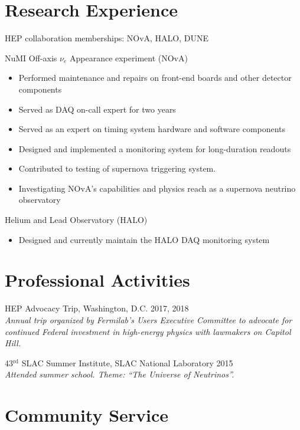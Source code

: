 \documentclass[11pt]{cv}
\begin{document}
\begin{cv}
\section{Research Experience}

HEP collaboration memberships: NOvA, HALO, DUNE

NuMI Off-axis $\nu_e$ Appearance experiment (NOvA)
\begin{itemize}
  \item Performed maintenance and repairs on front-end boards and other detector components
  \item Served as DAQ on-call expert for two years
  \item Served as an expert on timing system hardware and software components
  \item Designed and implemented a monitoring system for long-duration readouts
  \item Contributed to testing of supernova triggering system.
  \item Investigating NOvA's capabilities and physics reach as a supernova neutrino observatory
\end{itemize}

Helium and Lead Observatory (HALO)
\begin{itemize}
  \item Designed and currently maintain the HALO DAQ monitoring system
\end{itemize}


\section{Professional Activities}

HEP Advocacy Trip, Washington, D.C. \hfill 2017, 2018 \\
\emph{Annual trip organized by Fermilab's Users Executive Committee to advocate for continued Federal investment in high-energy physics with lawmakers on Capitol Hill.}

43$^{\text{rd}}$ SLAC Summer Institute, SLAC National Laboratory \hfill 2015 \\
\emph{Attended summer school. Theme: ``The Universe of Neutrinos''.}


\section{Community Service}


\end{cv}
\end{document}
